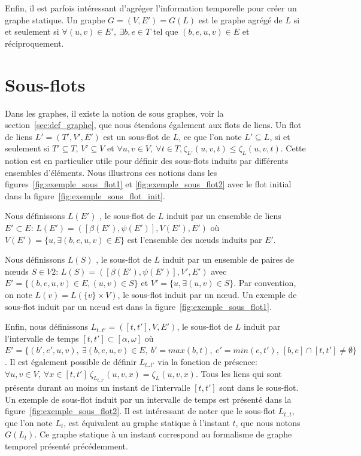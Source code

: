 Enfin, il est parfois intéressant d'agréger l'information temporelle pour créer un graphe statique.
Un graphe $G=(V,E')=G(L)$ est le graphe agrégé de $L$ si et seulement si $\forall (u,v) \in E',\ \exists b,e \in T$ tel que $(b,e,u,v) \in E$ et réciproquement.




\section{Sous-flots}
Dans les graphes, il existe la notion de sous graphes, voir la section~\ref{sec:def_graphe}, que nous étendons également aux flots de liens.
Un flot de liens $L'=(T',V',E')$ est un sous-flot de $L$, ce que l'on note $L' \subseteq L$, si et seulement si $T'\subseteq T$, $V'\subseteq V$ et  $\forall u,v \in V,\ \forall t\in T, \zeta_{L'}(u,v,t) \leq \zeta_{L}(u,v,t)$.
Cette notion est en particulier utile pour définir des sous-flots induits par différents ensembles d'éléments.
Nous illustrons ces notions dans les figures~\ref{fig:exemple_sous_flot1} et \ref{fig:exemple_sous_flot2} avec le flot initial dans la figure~\ref{fig:exemple_sous_flot_init}.
 
Nous définissons $L(E')$ , le sous-flot de $L$ induit par un ensemble de liens $E' \subset E$: $L(E')=([\beta(E'),\psi(E')],V(E'),E')$ où $V(E')=\{u, \exists (b,e,u,v) \in E\}$ est l'ensemble des n\oe{}uds induits par $E'$.

 
Nous définissons $L(S)$ , le sous-flot de $L$ induit par un ensemble de paires de n\oe{}uds $S \in V2$: $L(S)=([\beta(E'),\psi(E')],V',E')$ avec $E'= \{(b,e,u,v) \in E, (u,v) \in S\}$ et $V'=\{u, \exists (u,v) \in S\}$.
Par convention, on note $L(v)= L(\{v\}\times V)$, le sous-flot induit par un n\oe{}ud.
Un exemple de sous-flot induit par un n\oe{}ud est dans la figure~\ref{fig:exemple_sous_flot1}.


Enfin, nous définissons $L_{t..t'}=([t, t'], V,E')$, le sous-flot de $L$ induit par l'intervalle de temps $[t,t'] \subset [\alpha, \omega]$ où $E'= \{(b',e',u,v),\ \exists (b,e,u,v) \in E,\ b'= max(b,t),\ e'=min(e,t'),\ [b,e]\cap [t,t']\neq \emptyset\}$.
Il est également possible de définir $L_{t..t'}$ via la fonction de présence: $\forall u,v \in V,\ \forall x \in [t,t']\  \zeta_{L_{t..t'}}(u,v,x) = \zeta_{L}(u,v,x)$.
Tous les liens qui sont présents durant au moins un instant de l'intervalle $[t, t']$ sont dans le sous-flot.
Un exemple de sous-flot induit par un intervalle de temps est présenté dans la figure~\ref{fig:exemple_sous_flot2}.
Il est intéressant de noter que le sous-flot $L_{t..t}$, que l'on note $L_t$, est équivalent au graphe statique à l'instant $t$,  que nous notons $G(L_t)$.
Ce graphe statique à un instant correspond au formalisme de graphe temporel présenté précédemment.


